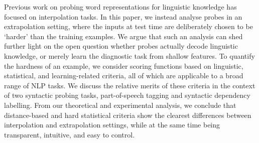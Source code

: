 Previous work on probing word representations for linguistic knowledge has focused on interpolation tasks. In this paper, we instead analyse probes in an extrapolation setting, where the inputs at test time are deliberately chosen to be `harder' than the training examples. We argue that such an analysis can shed further light on the open question whether probes actually decode linguistic knowledge, or merely learn the diagnostic task from shallow features. To quantify the hardness of an example, we consider scoring functions based on linguistic, statistical, and learning-related criteria, all of which are applicable to a broad range of NLP tasks. We discuss the relative merits of these criteria in the context of two syntactic probing tasks, part-of-speech tagging and syntactic dependency labelling. From our theoretical and experimental analysis, we conclude that distance-based and hard statistical criteria show the clearest differences between interpolation and extrapolation settings, while at the same time being transparent, intuitive, and easy to control.
